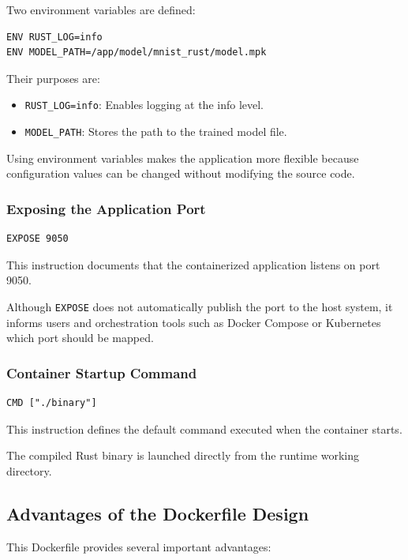 \documentclass[11pt,a4paper]{article}
\begin{document}
Two environment variables are defined:

\begin{verbatim}
ENV RUST_LOG=info
ENV MODEL_PATH=/app/model/mnist_rust/model.mpk
\end{verbatim}

Their purposes are:

\begin{itemize}
    \item \texttt{RUST\_LOG=info}: Enables logging at the info level.
    \item \texttt{MODEL\_PATH}: Stores the path to the trained model file.
\end{itemize}

Using environment variables makes the application more flexible because configuration values can be changed without modifying the source code.

\subsubsection{Exposing the Application Port}

\begin{verbatim}
EXPOSE 9050
\end{verbatim}

This instruction documents that the containerized application listens on port 9050.

Although \texttt{EXPOSE} does not automatically publish the port to the host system, it informs users and orchestration tools such as Docker Compose or Kubernetes which port should be mapped.

\subsubsection{Container Startup Command}

\begin{verbatim}
CMD ["./binary"]
\end{verbatim}

This instruction defines the default command executed when the container starts.

The compiled Rust binary is launched directly from the runtime working directory.

\subsection{Advantages of the Dockerfile Design}

This Dockerfile provides several important advantages:
\end{document}
